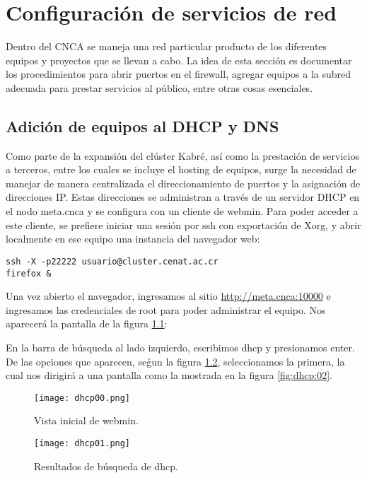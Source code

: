 \chapter{Configuración de servicios de red}
Dentro del CNCA se maneja una red particular producto de los diferentes equipos y proyectos que se llevan a cabo. La idea de esta sección es documentar los procedimientos para abrir puertos en el firewall, agregar equipos a la subred adecuada para prestar servicios al público, entre otras cosas esenciales.

\section{Adición de equipos al DHCP y DNS}
Como parte de la expansión del clúster Kabré, así como la prestación de servicios a terceros, entre los cuales se incluye el hosting de equipos, surge la necesidad de manejar de manera centralizada el direccionamiento de puertos y la asignación de direcciones IP. Estas direcciones se administran a través de un servidor DHCP en el nodo meta.cnca y se configura con un cliente de webmin. Para poder acceder a este cliente, se prefiere iniciar una sesión por ssh con exportación de Xorg, y abrir localmente en ese equipo una instancia del navegador web:

\begin{lstlisting}
ssh -X -p22222 usuario@cluster.cenat.ac.cr
firefox &
\end{lstlisting}

Una vez abierto el navegador, ingresamos al sitio \url{http://meta.cnca:10000} e ingresamos las credenciales de root para poder administrar el equipo. Nos aparecerá la pantalla de la figura \ref{fig:dhcp:00}:

En la barra de búsqueda al lado izquierdo, escribimos dhcp y presionamos enter. De las opciones que aparecen, seǵun la figura \ref{fig:dhcp:01}, seleccionamos la primera, la cual nos dirigirá a una pantalla como la mostrada en la figura \ref{fig:dhcp:02}.

\begin{figure}[H]
\centering
\texttt{[image: dhcp00.png]}
\caption{Vista inicial de webmin.}
\label{fig:dhcp:00}
\end{figure}

\begin{figure}[H]
\centering
\texttt{[image: dhcp01.png]}
\caption{Resultados de búsqueda de dhcp.}
\label{fig:dhcp:01}
\end{figure}

